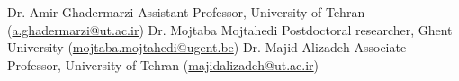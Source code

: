 
\begin{cvskills}
  \cvskill
    {Dr. Amir Ghadermarzi \hfill}
    {Assistant Professor, University of Tehran (\href{mailto:a.ghadermarzi@ut.ac.ir}{a.ghadermarzi@ut.ac.ir})}
  \cvskill
    {Dr. Mojtaba Mojtahedi \hfill}
    {Postdoctoral researcher, Ghent University (\href{mailto:mojtaba.mojtahedi@ugent.be}{mojtaba.mojtahedi@ugent.be})}
  \cvskill
    {Dr. Majid Alizadeh \hfill}
    {Associate Professor, University of Tehran (\href{mailto:majidalizadeh@ut.ac.ir}{majidalizadeh@ut.ac.ir})}
\end{cvskills}
